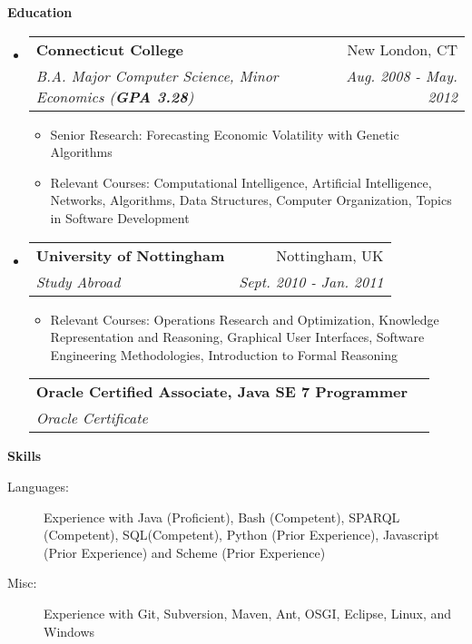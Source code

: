 \documentclass[letterpaper,11pt]{article}
\makeatletter
\newcommand{\resitem}[1]{\item #1 \vspace{-2pt}}
\newcommand{\resheading}[1]{{\large \colorbox{mygrey}{\begin{minipage}{\textwidth}{\textbf{#1 \vphantom{p\^{E}}}}\end{minipage}}}}
\newcommand{\ressubheading}[4]{
\begin{tabular*}{7.0in}{l@{\extracolsep{\fill}}r}
		\textbf{#1} & #2 \\
		\textit{#3} & \textit{#4} \\
\end{tabular*}\vspace{-6pt}}
\makeatother
\begin{document}
\resheading{Education}
\begin{itemize}
	\item
	\ressubheading{Connecticut College}{New London, CT}{B.A. Major Computer Science, Minor Economics (\textbf{GPA 3.28})}{Aug. 2008 - May. 2012}
	\begin{itemize}
		\resitem{Senior Research: Forecasting Economic Volatility with Genetic Algorithms}
		\resitem{Relevant Courses: Computational Intelligence, Artificial Intelligence, Networks, Algorithms, Data Structures, Computer Organization, Topics in Software Development}
	\end{itemize}
	
	\item
	\ressubheading{University of Nottingham}{Nottingham, UK}{Study Abroad}{Sept. 2010 - Jan. 2011}
	\begin{itemize}
		\resitem{Relevant Courses: Operations Research and Optimization, Knowledge Representation and Reasoning, Graphical User Interfaces, Software Engineering Methodologies, Introduction to Formal Reasoning}
	\end{itemize}
	\ressubheading{Oracle Certified Associate, Java SE 7 Programmer}{}{Oracle Certificate}{}
\end{itemize}


\resheading{Skills}
\begin{description}
	\item[Languages:]
		Experience with Java (Proficient), Bash (Competent), SPARQL (Competent), SQL(Competent), Python (Prior Experience), Javascript (Prior Experience) and Scheme (Prior Experience)
	\item[Misc:]
		Experience with Git, Subversion, Maven, Ant, OSGI, Eclipse, Linux, and Windows
\end{description}
\end{document}
